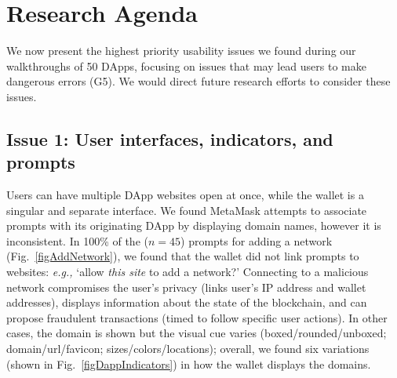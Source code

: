 \documentclass[conference]{IEEEtran}
\begin{document}





\section{Research Agenda}
\label{sec:results:topIssues}

We now present the highest priority usability issues we found during our walkthroughs of 50 DApps, focusing on issues that may lead users to make dangerous errors (G5). We would direct future research efforts to consider these issues.


\subsection{Issue 1: User interfaces, indicators, and prompts}

Users can have multiple DApp websites open at once, while the wallet is a singular and separate interface. We found MetaMask attempts to associate prompts with its originating DApp by displaying domain names, however it is inconsistent.
In 100\% of the ($n=45$) prompts for adding a network (Fig.~\ref{figAddNetwork}), we found that the wallet did not link prompts to websites: \textit{e.g.,} `allow \textit{this site} to add a network?' Connecting to a malicious network compromises the user's privacy (links user's IP address and wallet addresses), displays information about the state of the blockchain, and can propose fraudulent transactions (timed to follow specific user actions). In other cases, the domain is shown but the visual cue varies (boxed/rounded/unboxed; domain/url/favicon; sizes/colors/locations); overall, we found six variations (shown in Fig.~\ref{figDappIndicators}) in how the wallet displays the domains.
\end{document}
